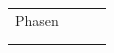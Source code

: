\begin{landscape}
\begin{table}[]
{\begin{tabular}{lllllll}
\multicolumn{7}{l}{Phasen}                                                                                                                                                                                                                                                                                                                                                                                                                                                                                                                                                                                                                                                                                                                                                                                                                                                                                                                                                                                                                                                                            \\
\multicolumn{7}{l}{}                                                                                                                                                                                                                                                                                                                                                                                                                                                                                                                                                                                                                                                                                                                                                                                                                                                                                                                                                                                                                                                                                  \\
\rowcolor[HTML]{A6A6A6}

\end{tabular}}
\end{table}
\end{landscape}
